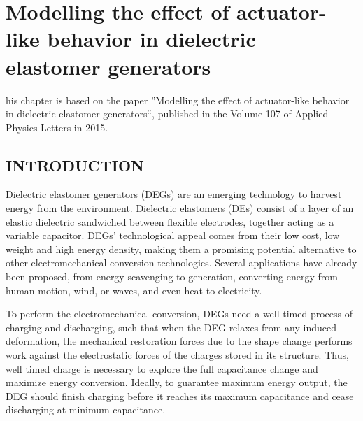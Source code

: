 \let\textcircled=\pgftextcircled
\chapter{Modelling the effect of actuator-like behavior in dielectric elastomer generators}
\label{chap:1}

his chapter is based on the paper ''Modelling the effect of actuator-like behavior in dielectric elastomer generators``, published in the Volume 107 of Applied Physics Letters in 2015.



\section{INTRODUCTION}
\label{sec:intro}  %

Dielectric elastomer generators (DEGs) are an emerging technology to harvest energy from the environment. Dielectric elastomers (DEs) consist of a layer of an elastic dielectric sandwiched between flexible electrodes, together acting as a variable capacitor\cite{RN226}. DEGs' technological appeal comes from their low cost, low weight and high energy density\cite{RN19}, making them a promising potential alternative to other electromechanical conversion technologies. Several applications have already been proposed, from energy scavenging to generation, converting energy from human motion, wind, or waves, and even heat to electricity\cite{RN19,RN18,MistralHMotion2008,RN166,RN194}.

To perform the electromechanical conversion, DEGs need a well timed process of charging and discharging, such that when the DEG relaxes from any induced deformation, the mechanical restoration forces due to the shape change performs work against the electrostatic forces of the charges stored in its structure. Thus, well timed charge is necessary to explore the full capacitance change and maximize energy conversion. Ideally, to guarantee maximum energy output, the DEG should finish charging before it reaches its maximum capacitance and cease discharging at minimum capacitance\cite{RN85}.

